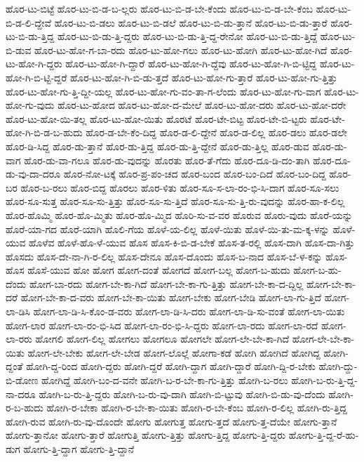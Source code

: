 {ಹೊರ-ಟು-ಬಿಟ್ಟೆ
ಹೊರ-ಟು-ಬಿ-ಡ-ಬ-ಲ್ಲರು
ಹೊರ-ಟು-ಬಿ-ಡ-ಬೇ-ಕೆಂದು
ಹೊರ-ಟು-ಬಿ-ಡ-ಬೇ-ಕೆಂಬ
ಹೊರ-ಟು-ಬಿ-ಡ-ಲಿ-ದ್ದೇವೆ
ಹೊರ-ಟು-ಬಿ-ಡಲು
ಹೊರ-ಟು-ಬಿ-ಡಲೆ
ಹೊರ-ಟು-ಬಿ-ಡು-ತ್ತಾನೆ
ಹೊರ-ಟು-ಬಿ-ಡು-ತ್ತಾರೆ
ಹೊರ-ಟು-ಬಿ-ಡು-ತ್ತಿದ್ದ
ಹೊರ-ಟು-ಬಿ-ಡು-ತ್ತಿ-ದ್ದರು
ಹೊರ-ಟು-ಬಿ-ಡು-ತ್ತಿ-ದ್ದ-ರೇನೋ
ಹೊರ-ಟು-ಬಿ-ಡು-ತ್ತಿದ್ದೆ
ಹೊರ-ಟು-ಬಿ-ಡುವ
ಹೊರ-ಟು-ಹೋ-ಗ-ಬಾ-ರದು
ಹೊರ-ಟು-ಹೋ-ಗಲು
ಹೊರ-ಟು-ಹೋಗಿ
ಹೊರ-ಟು-ಹೋ-ಗಿದೆ
ಹೊರ-ಟು-ಹೋ-ಗಿ-ದ್ದರು
ಹೊರ-ಟು-ಹೋ-ಗಿ-ದ್ದಾರೆ
ಹೊರ-ಟು-ಹೋ-ಗಿ-ದ್ದೆವು
ಹೊರ-ಟು-ಹೋ-ಗಿ-ಬಿ-ಟ್ಟಿದ್ದ
ಹೊರ-ಟು-ಹೋ-ಗಿ-ಬಿ-ಟ್ಟಿ-ದ್ದರೆ
ಹೊರ-ಟು-ಹೋ-ಗಿ-ಬಿ-ಡು-ತ್ತದೆ
ಹೊರ-ಟು-ಹೋ-ಗು-ತ್ತಾರೆ
ಹೊರ-ಟು-ಹೋ-ಗು-ತ್ತಿತ್ತು
ಹೊರ-ಟು-ಹೋ-ಗು-ತ್ತಿ-ದ್ದೀ-ಯಲ್ಲ
ಹೊರ-ಟು-ಹೋ-ಗು-ವಂ-ತಾ-ಗ-ಲೆಂದು
ಹೊರ-ಟು-ಹೋ-ಗು-ವಾಗ
ಹೊರ-ಟು-ಹೋ-ಗು-ವುದು
ಹೊರ-ಟು-ಹೋದ
ಹೊರ-ಟು-ಹೋ-ದ-ಮೇಲೆ
ಹೊರ-ಟು-ಹೋ-ದರು
ಹೊರ-ಟು-ಹೋ-ದರೇ
ಹೊರ-ಟು-ಹೋ-ಯಿ-ತಲ್ಲ
ಹೊರ-ಟು-ಹೋ-ಯಿತು
ಹೊರಟೆ
ಹೊರ-ಟೇ-ಬಿಟ್ಟ
ಹೊರ-ಟೇ-ಬಿ-ಟ್ಟರು
ಹೊರ-ಟೇ-ಹೋ-ಗಿ-ಬಿ-ಡ-ಬ-ಹುದು
ಹೊರ-ಡ-ಬೇ-ಕೆಂ-ದಿದ್ದ
ಹೊರ-ಡ-ಲಿ-ದ್ದೇನೆ
ಹೊರ-ಡ-ಲಿಲ್ಲ
ಹೊರ-ಡಲು
ಹೊರ-ಡಲೇ
ಹೊರ-ಡಿ-ಸಿದ್ದ
ಹೊರ-ಡು-ತ್ತಾನೆ
ಹೊರ-ಡು-ತ್ತಿದ್ದ
ಹೊರ-ಡು-ತ್ತಿ-ದ್ದೇನೆ
ಹೊರ-ಡು-ತ್ತಿಲ್ಲ
ಹೊರ-ಡುವ
ಹೊರ-ಡು-ವಾಗ
ಹೊರ-ಡು-ವಾ-ಗಲೂ
ಹೊರ-ಡು-ವುದನ್ನು
ಹೊರತು
ಹೊರ-ತೆ-ಗೆದು
ಹೊರ-ದೂ-ಡಿ-ದಂ-ತಾಗಿ
ಹೊರ-ದೂ-ಡು-ವು-ದಾ-ದರೂ
ಹೊರ-ನೋ-ಟಕ್ಕೆ
ಹೊರ-ಪ್ರ-ಪಂ-ಚದ
ಹೊರ-ಬಂದ
ಹೊರ-ಬಂ-ದಿದೆ
ಹೊರ-ಬಂ-ದಿದ್ದ
ಹೊರ-ಬರ
ಹೊರ-ಬ-ರಲು
ಹೊರ-ಬಿದ್ದ
ಹೊರಲು
ಹೊರ-ಳಿತು
ಹೊರ-ಸೂ-ಸ-ಲಾ-ರಂ-ಭಿ-ಸಿ-ದಾಗ
ಹೊರ-ಸೂ-ಸಲು
ಹೊರ-ಸೂ-ಸುತ್ತ
ಹೊರ-ಸೂ-ಸು-ತ್ತಿತ್ತು
ಹೊರ-ಸೂ-ಸು-ತ್ತಿದೆ
ಹೊರ-ಸೂ-ಸು-ತ್ತಿ-ರು-ವುದನ್ನು
ಹೊರ-ಹಾ-ಕ-ಲಿಲ್ಲ
ಹೊರ-ಹೊಮ್ಮಿ
ಹೊರ-ಹೊ-ಮ್ಮಿತು
ಹೊರ-ಹೊ-ಮ್ಮಿದ
ಹೊರಿ-ಸು-ವ-ವರ
ಹೊರುವ
ಹೊರು-ವುದು
ಹೊರೆ-ಯನ್ನು
ಹೊರೆ-ಯಾ-ಗದ
ಹೊರೆ-ಯಾಗಿ
ಹೊಲಿ-ಗೆಯ
ಹೊಳೆ-ಯ-ಲಿಲ್ಲ
ಹೊಳೆ-ಯಿತು
ಹೊಳೆ-ಯಿ-ತು-ಮ-ಕ್ಕ-ಳನ್ನು
ಹೊಳೆ-ಯುವ
ಹೊಳೆವ
ಹೊಳೆ-ಹೊ-ಳೆ-ಯುವ
ಹೊಸ
ಹೊಸ-ಕಿ-ಬಿ-ಡ-ಬೇಕೆ
ಹೊಸ-ತ-ರಲ್ಲಿ
ಹೊಸ-ದಾಗಿ
ಹೊಸ-ದಾ-ಗಿತ್ತು
ಹೊಸದು
ಹೊಸ-ದೇ-ನಾ-ಗಿ-ರ-ಲಿಲ್ಲ
ಹೊಸ-ದೇನೂ
ಹೊಸ-ದೊಂದು
ಹೊಸ-ಬ-ನಾದ
ಹೊಸ-ಬೆ-ಳ-ಕನ್ನು
ಹೊಸ-ಹೊಸ
ಹೊಸೆ-ಯುವ
ಹೋ
ಹೋಗ
ಹೋಗ-ದಂತೆ
ಹೋಗದೆ
ಹೋಗ-ಬಲ್ಲ
ಹೋಗ-ಬ-ಹುದು
ಹೋಗ-ಬ-ಹು-ದೆಂದು
ಹೋಗ-ಬಾ-ರದು
ಹೋಗ-ಬೇ-ಕಾ-ಗಿದೆ
ಹೋಗ-ಬೇ-ಕಾ-ಗು-ತ್ತಿತ್ತು
ಹೋಗ-ಬೇ-ಕಾ-ದ-ದ್ದಿಲ್ಲ
ಹೋಗ-ಬೇ-ಕಾ-ದರೆ
ಹೋಗ-ಬೇ-ಕಾ-ದ-ವರು
ಹೋಗ-ಬೇ-ಕಾ-ಯಿತು
ಹೋಗ-ಬೇಕು
ಹೋಗ-ಬೇಡಿ
ಹೋಗ-ಲಾ-ಗು-ತ್ತಿದೆ
ಹೋಗ-ಲಾ-ಡಿಸಿ
ಹೋಗ-ಲಾ-ಡಿ-ಸಿ-ಕೊಂ-ಡ-ವರು
ಹೋಗ-ಲಾ-ಡಿ-ಸಿ-ದರು
ಹೋಗ-ಲಾ-ಡಿ-ಸು-ವಂತೆ
ಹೋಗ-ಲಾ-ಯಿತು
ಹೋಗ-ಲಾರ
ಹೋಗ-ಲಾ-ರಂ-ಭಿ-ಸಿದ
ಹೋಗ-ಲಾ-ರಂ-ಭಿ-ಸಿ-ದ್ದರು
ಹೋಗ-ಲಾ-ರದು
ಹೋಗ-ಲಾ-ರದೆ
ಹೋಗ-ಲಾ-ರರು
ಹೋಗಲಿ
ಹೋಗ-ಲಿಲ್ಲ
ಹೋಗಲು
ಹೋಗಲೂ
ಹೋಗಲೇ
ಹೋಗ-ಲೇ-ಬೇ-ಕಾ-ಗಿದೆ
ಹೋಗ-ಲೇ-ಬೇ-ಕಾ-ಯಿತು
ಹೋಗ-ಲೇ-ಬೇಕು
ಹೋಗ-ಲೇ-ಬೇಡ
ಹೋಗ-ಲೊಲ್ಲೆ
ಹೋಗಾ-ಕಡೆ
ಹೋಗಿ
ಹೋಗಿದೆ
ಹೋಗಿದ್ದ
ಹೋಗಿ-ದ್ದಂತೆ
ಹೋಗಿ-ದ್ದ-ರಿಂದ
ಹೋಗಿ-ದ್ದರು
ಹೋಗಿ-ದ್ದರೆ
ಹೋಗಿ-ದ್ದಾಗ
ಹೋಗಿ-ದ್ದಾರೆ
ಹೋಗಿ-ದ್ದಿ-ರ-ಬೇಕು
ಹೋಗಿ-ದ್ದು-ಬಿ-ಡೋಣ
ಹೋಗಿದ್ದೆ
ಹೋಗಿ-ಬಂ-ದ-ವನೇ
ಹೋಗಿ-ಬ-ರ-ಬೇ-ಕಾ-ಗು-ತ್ತಿತ್ತು
ಹೋಗಿ-ಬ-ರಲು
ಹೋಗಿ-ಬ-ರು-ತ್ತಿ-ದ್ದ-ನಾ-ದರೂ
ಹೋಗಿ-ಬ-ರು-ತ್ತಿ-ದ್ದರು
ಹೋಗಿ-ಬ-ರು-ವು-ದಾಗಿ
ಹೋಗಿ-ಬಿ-ಟ್ಟುವು
ಹೋಗಿ-ಬಿ-ಡು-ವು-ದೆಂದು
ಹೋಗಿ-ರ-ಬ-ಹುದು
ಹೋಗಿ-ರ-ಬೇಕಾ
ಹೋಗಿ-ರ-ಬೇ-ಕಾ-ಯಿತು
ಹೋಗಿ-ರ-ಬೇ-ಕೆಂಬ
ಹೋಗಿ-ರ-ಲಿಲ್ಲ
ಹೋಗಿ-ರು-ತ್ತಿದ್ದ
ಹೋಗಿ-ರುವ
ಹೋಗಿ-ರು-ವು-ದೊಂದೇ
ಹೋಗು
ಹೋಗುತ್ತ
ಹೋಗು-ತ್ತದೆ
ಹೋಗು-ತ್ತ-ದೆಯೇ
ಹೋಗು-ತ್ತಾನೆ
ಹೋಗು-ತ್ತಾನೋ
ಹೋಗು-ತ್ತಾರೆ
ಹೋಗುತ್ತಿ
ಹೋಗು-ತ್ತಿತ್ತು
ಹೋಗು-ತ್ತಿದ್ದ
ಹೋಗು-ತ್ತಿ-ದ್ದರು
ಹೋಗು-ತ್ತಿ-ದ್ದ-ರೆ-ಹು-ಡುಗ
ಹೋಗು-ತ್ತಿ-ದ್ದಾಗ
ಹೋಗು-ತ್ತಿ-ದ್ದಾನೆ
}
